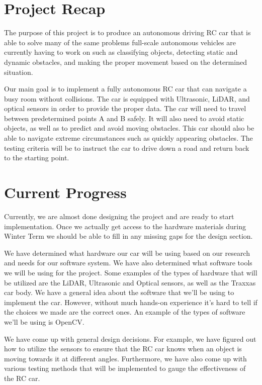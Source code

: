 \documentclass[onecolumn, draftclsnofoot,10pt, compsoc]{IEEEtran}
\begin{document}
\section{Project Recap}
The purpose of this project is to produce an autonomous driving RC car that is able to solve many of the same problems full-scale autonomous vehicles are currently having to work on such as classifying objects, detecting static and dynamic obstacles, and making the proper movement based on the determined situation.

Our main goal is to implement a fully autonomous RC car that can navigate a busy room without collisions. The car is equipped with Ultrasonic, LiDAR, and optical sensors in order to provide the proper data. The car will need to travel between predetermined points A and B safely. It will also need to avoid static objects, as well as to predict and avoid moving obstacles. This car should also be able to navigate extreme circumstances such as quickly appearing obstacles. The testing criteria will be to instruct the car to drive down a road and return back to the starting point.


\section{Current Progress}
Currently, we are almost done designing the project and are ready to start implementation. Once we actually get access to the hardware materials during Winter Term we should be able to fill in any missing gaps for the design section.  

We have determined what hardware our car will be using based on our research and needs for our software system. We have also determined what software tools we will be using for the project. Some examples of the types of hardware that will be utilized are the LiDAR, Ultrasonic and Optical sensors, as well as the Traxxas car body. We have a general idea about the software that we'll be using to implement the car. However, without much hands-on experience it's hard to tell if the choices we made are the correct ones. An example of the types of software we'll be using is OpenCV.

We have come up with general design decisions. For example, we have figured out how to utilize the sensors to ensure that the RC car knows when an object is moving towards it at different angles. Furthermore, we have also come up with various testing methods that will be implemented to gauge the effectiveness of the RC car.
\end{document}
